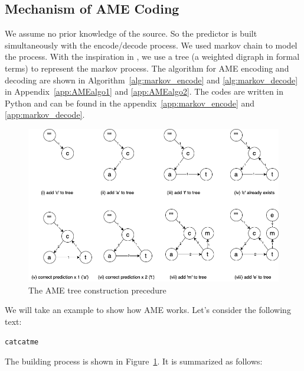 \documentclass[12pt,twoside]{article}
\begin{document}
\subsection{Mechanism of AME Coding}
\label{sec:markov}


We assume no prior knowledge of the source. So the predictor is built simultaneously with the encode/decode process. We used markov chain to model the process. With the inspiration in \cite{ref1}, we use a tree (a weighted digraph in formal terms) to represent the markov process. The algorithm for AME encoding and decoding are shown in Algorithm~\ref{alg:markov_encode} and \ref{alg:markov_decode} in Appendix~\ref{app:AMEalgo1} and \ref{app:AMEalgo2}. The codes are written in Python and can be found in the appendix~\ref{app:markov_encode} and \ref{app:markov_decode}.

\begin{figure}[h!]
    \centering
    \includegraphics[width=\textwidth]{AMEtree.png}
    \caption{The AME tree construction precedure}
    \label{fig:AMEtree}
\end{figure}

We will take an example to show how AME works. Let's consider the following text:

\begin{lstlisting}[language=bash, style=custombash]
catcatme
\end{lstlisting}

The building process is shown in Figure~\ref{fig:AMEtree}. It is summarized as follows:
\end{document}
